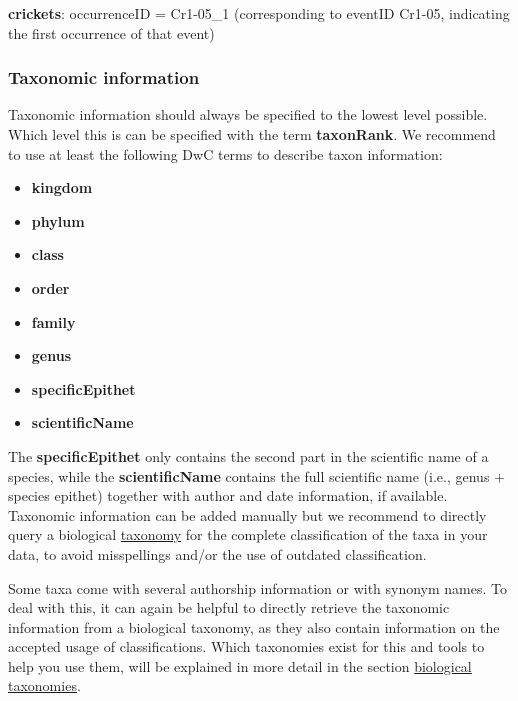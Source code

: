 \documentclass[
  oneside]{book}
\begin{document}
\begin{examplebox}

\textbf{crickets}: occurrenceID = Cr1-05\_1 (corresponding to eventID Cr1-05, indicating the first occurrence of that event)

\end{examplebox}

\subsubsection{Taxonomic information}\label{taxonomic-information}

Taxonomic information should always be specified to the lowest level possible. Which level this is can be specified with the term \textbf{taxonRank}. We recommend to use at least the following DwC terms to describe taxon information:

\begin{itemize}
\item
  \textbf{kingdom}
\item
  \textbf{phylum}
\item
  \textbf{class}
\item
  \textbf{order}
\item
  \textbf{family}
\item
  \textbf{genus}
\item
  \textbf{specificEpithet}
\item
  \textbf{scientificName}
\end{itemize}

The \textbf{specificEpithet} only contains the second part in the scientific name of a species, while the \textbf{scientificName} contains the full scientific name (i.e., genus + species epithet) together with author and date information, if available. Taxonomic information can be added manually but we recommend to directly query a biological \hyperref[taxonomy]{taxonomy} for the complete classification of the taxa in your data, to avoid misspellings and/or the use of outdated classification.

Some taxa come with several authorship information or with synonym names. To deal with this, it can again be helpful to directly retrieve the taxonomic information from a biological taxonomy, as they also contain information on the accepted usage of classifications. Which taxonomies exist for this and tools to help you use them, will be explained in more detail in the section \hyperref[biological-taxonomies]{biological taxonomies}.
\end{document}
